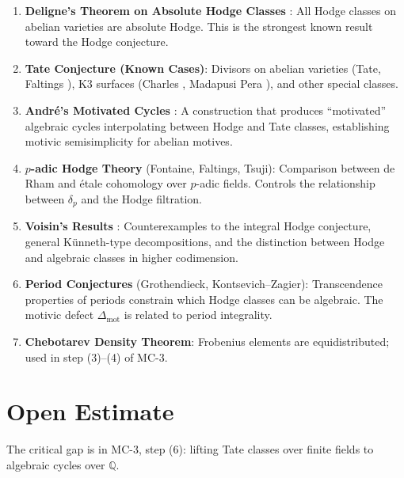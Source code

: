 \documentclass[11pt]{article}
\theoremstyle{definition}
\begin{document}
\begin{enumerate}
  \item \textbf{Deligne's Theorem on Absolute Hodge Classes} \cite{Deligne}:
    All Hodge classes on abelian varieties are absolute Hodge.
    This is the strongest known result toward the Hodge conjecture.

  \item \textbf{Tate Conjecture (Known Cases)}:
    Divisors on abelian varieties (Tate, Faltings \cite{Faltings}),
    K3 surfaces (Charles \cite{Charles}, Madapusi Pera \cite{MP}),
    and other special classes.

  \item \textbf{Andr\'e's Motivated Cycles} \cite{Andre}:
    A construction that produces ``motivated'' algebraic cycles
    interpolating between Hodge and Tate classes, establishing motivic semisimplicity
    for abelian motives.

  \item \textbf{$p$-adic Hodge Theory} (Fontaine, Faltings, Tsuji):
    Comparison between de Rham and \'etale cohomology over $p$-adic fields.
    Controls the relationship between $\delta_p$ and the Hodge filtration.

  \item \textbf{Voisin's Results} \cite{Voisin}:
    Counterexamples to the integral Hodge conjecture,
    general K\"unneth-type decompositions, and the distinction between
    Hodge and algebraic classes in higher codimension.

  \item \textbf{Period Conjectures} (Grothendieck, Kontsevich--Zagier):
    Transcendence properties of periods constrain which Hodge classes can be algebraic.
    The motivic defect $\Delta_{\mathrm{mot}}$ is related to period integrality.

  \item \textbf{Chebotarev Density Theorem}:
    Frobenius elements are equidistributed; used in step (3)--(4) of MC-3.
\end{enumerate}

\section{Open Estimate}

The critical gap is in MC-3, step (6): lifting Tate classes over finite fields
to algebraic cycles over $\mathbb{Q}$.
\end{document}
